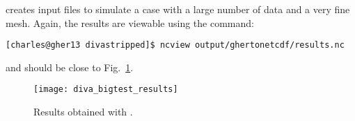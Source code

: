  creates input files to simulate a case with a large number of data and a very fine mesh. Again, the results are viewable using the command:
\begin{lstlisting}[style=Bash]
[charles@gher13 divastripped]$ ncview output/ghertonetcdf/results.nc
\end{lstlisting}
and should be close to Fig.~\ref{fig:diva_bigtest_results}.

\begin{figure}[H]
\centering 
\texttt{[image: diva\_bigtest\_results]}
\caption{Results obtained with .\label{fig:diva_bigtest_results}}
\end{figure}



%
%
%
%
%
%
%
%
%
%
%

